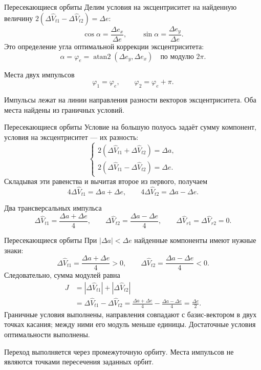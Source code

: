 \documentclass[11pt,aspectratio=169,t]{beamer}
\newcommand{\derivationmathspacing}{%
  \setlength{\abovedisplayskip}{2pt}%
  \setlength{\belowdisplayskip}{3pt}%
  \setlength{\abovedisplayshortskip}{2pt}%
  \setlength{\belowdisplayshortskip}{2pt}%
  \setlength{\jot}{2pt}}
\begin{document}
\begin{frame}{Пересекающиеся орбиты}
\relax
\derivationmathspacing
Делим условия на эксцентриситет на найденную величину
$2(\Delta\widehat V_{t1}-\Delta\widehat V_{t2})=\Delta e$:
\[
 \cos\alpha=\frac{\Delta e_x}{\Delta e},\qquad
 \sin\alpha=\frac{\Delta e_y}{\Delta e}.
\]
Это определение угла оптимальной коррекции эксцентриситета:
\[
 \alpha=\varphi_e=\operatorname{atan2}(\Delta e_y,\Delta e_x)
 \quad\text{по модулю }2\pi.
\]
\begin{block}{Места двух импульсов}
\[
 \varphi_1=\varphi_e,\qquad \varphi_2=\varphi_e+\pi.
\]
\end{block}
\justifying
Импульсы лежат на линии направления разности векторов эксцентриситета.
Оба места найдены из граничных условий.
\end{frame}

\begin{frame}{Пересекающиеся орбиты}
\relax
\derivationmathspacing
Условие на большую полуось задаёт сумму компонент,
условия на эксцентриситет --- их разность:
\[
\begin{cases}
 2(\Delta\widehat V_{t1}+\Delta\widehat V_{t2})=\Delta a,\\
 2(\Delta\widehat V_{t1}-\Delta\widehat V_{t2})=\Delta e.
\end{cases}
\]
Складывая эти равенства и вычитая второе из первого, получаем
\[
 4\Delta\widehat V_{t1}=\Delta a+\Delta e,\qquad
 4\Delta\widehat V_{t2}=\Delta a-\Delta e.
\]
\begin{block}{Два трансверсальных импульса}
\[
 \Delta\widehat V_{t1}=\frac{\Delta a+\Delta e}{4},\qquad
 \Delta\widehat V_{t2}=\frac{\Delta a-\Delta e}{4},\qquad
 \Delta\widehat V_{r1}=\Delta\widehat V_{r2}=0.
\]
\end{block}
\end{frame}

\begin{frame}{Пересекающиеся орбиты}
\relax
\derivationmathspacing
При $|\Delta a|<\Delta e$ найденные компоненты имеют нужные знаки:
\[
 \Delta\widehat V_{t1}=\frac{\Delta a+\Delta e}{4}>0,\qquad
 \Delta\widehat V_{t2}=\frac{\Delta a-\Delta e}{4}<0.
\]
Следовательно, сумма модулей равна
\[
\begin{aligned}
 J&=|\Delta\widehat V_{t1}|+|\Delta\widehat V_{t2}|\\
  &=\Delta\widehat V_{t1}-\Delta\widehat V_{t2}
   =\frac{\Delta a+\Delta e}{4}-\frac{\Delta a-\Delta e}{4}
   =\frac{\Delta e}{2}.
\end{aligned}
\]
\justifying
Граничные условия выполнены, направления совпадают с базис-вектором
в двух точках касания; между ними его модуль меньше единицы.
Достаточные условия оптимальности выполнены.
\par\medskip
Переход выполняется через промежуточную орбиту.
Места импульсов не являются точками пересечения заданных орбит.
\end{frame}
\end{document}
